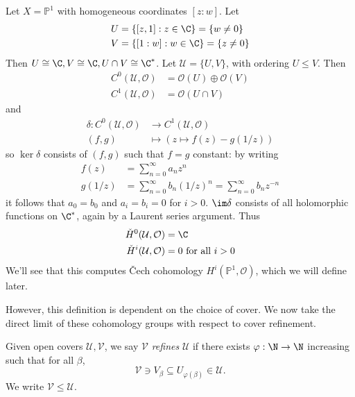 \documentclass[a4paper]{article}
\renewcommand{\P}{\mathbb P} %
\begin{document}
\begin{eg}
  Let \(X = \P^1\) with homogeneous coordinates \([z : w]\). Let
  \begin{align*}
    U &= \{[z, 1]: z \in \C\} = \{w \neq 0\} \\
    V &= \{[1: w]: w \in \C\} = \{z \neq 0\}
  \end{align*}
  Then \(U \cong \C, V \cong \C, U \cap V \cong \C^*\). Let \(\mathcal U = \{U, V\}\), with ordering \(U \leq V\). Then
  \begin{align*}
    C^0(\mathcal U, \mathcal O) &= \mathcal O(U) \oplus \mathcal O(V) \\
    C^1(\mathcal U, \mathcal O) &= \mathcal O(U \cap V)
  \end{align*}
  and
  \begin{align*}
    \delta: C^0(\mathcal U, \mathcal O) &\to C^1(\mathcal U, \mathcal O) \\
    (f, g) &\mapsto (z \mapsto f(z) - g(1/z))
  \end{align*}
  so \(\ker \delta\) consists of \((f, g)\) such that \(f = g\) constant: by writing
  \begin{align*}
    f(z) &= \sum_{n = 0}^\infty a_n z^n \\
    g(1/z) &= \sum_{n = 0}^\infty b_n (1/z)^n = \sum_{n = 0}^\infty b_n z^{-n}
  \end{align*}
  it follows that \(a_0 = b_0\) and \(a_i = b_i = 0\) for \(i > 0\).
  \(\im \delta\) consists of all holomorphic functions on \(\C^*\), again by a Laurent series argument. Thus
  \begin{align*}
    \check H^0(\mathcal U, \mathcal O) &= \C \\
    \check H^i(\mathcal U, \mathcal O) &= 0 \text{ for all } i > 0
  \end{align*}
  We'll see that this computes Čech cohomology \(H^i(\P^1, \mathcal O)\), which we will define later.
\end{eg}

However, this definition is dependent on the choice of cover. We now take the direct limit of these cohomology groups with respect to cover refinement.

\begin{definition}
  Given open covers \(\mathcal U, \mathcal V\), we say \(\mathcal V\) \emph{refines} \(\mathcal U\) if there exists \(\varphi: \N \to \N\) increasing such that for all \(\beta\),
  \[
    \mathcal V \ni V_\beta \subseteq U_{\varphi(\beta)} \in \mathcal U.
  \]
  We write \(\mathcal V \leq \mathcal U\).
\end{definition}
\end{document}

